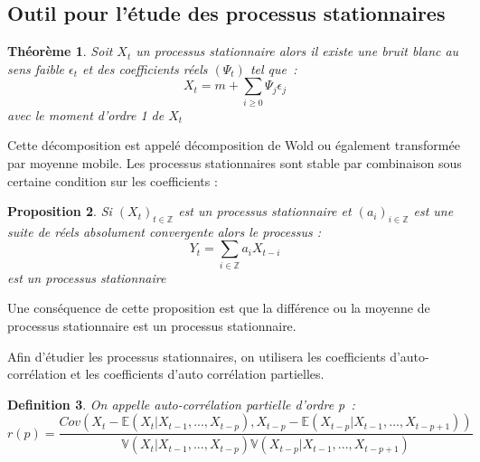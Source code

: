\documentclass[11pt]{scrartcl} %
\newtheorem{theorem}{Théorème}[section]
\newtheorem{Def}[theorem]{Definition}
\newtheorem{pro}[theorem]{Proposition}
\newcommand{\Xt}{\left(X_t\right)_{t\in\mathbb{Z}}}
\begin{document}
\subsection{Outil pour l'étude des processus stationnaires}
\begin{theorem}
Soit $X_t$ un processus stationnaire alors il existe une bruit blanc au sens faible $\epsilon_t$ et des coefficients réels $\left(\Psi_t\right)$ tel que~:
$$
X_t = m+\sum_{i\geq 0}\Psi_j\epsilon_j
$$
avec le moment d'ordre 1 de $X_t$
\end{theorem}
Cette décomposition est appelé décomposition de Wold ou également transformée par moyenne mobile.
Les processus stationnaires sont stable par combinaison sous certaine condition sur les coefficients : 
\begin{pro}
Si $\Xt$ est un processus stationnaire et $(a_i)_{i\in \mathbb{Z}}$ est une suite de réels absolument convergente alors le processus : 
$$
Y_t=\sum_{i\in\mathbb{Z}}a_i X_{t-i}
$$
est un processus stationnaire
\end{pro}
Une conséquence de cette proposition est que la différence ou la moyenne de processus stationnaire est un processus stationnaire.


Afin d'étudier les processus stationnaires, on utilisera les coefficients d'auto-corrélation et les coefficients d'auto corrélation partielles.
\begin{Def}
On appelle auto-corrélation partielle d'ordre p~:
$$
r(p)=\frac{Cov\left(X_t-\mathbb{E}\left(X_t|X_{t-1},...,X_{t-p}\right),X_{t-p}-\mathbb{E}\left(X_{t-p}|X_{t-1},...,X_{t-p+1}\right)\right)}{\mathbb{V}\left(X_t|X_{t-1},...,X_{t-p}\right)\mathbb{V}\left(X_{t-p}|X_{t-1},...,X_{t-p+1}\right)}
$$
\end{Def}
\end{document}
